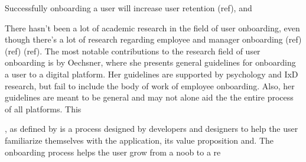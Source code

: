 Successfully onboarding a user will increase user retention (ref), and

There hasn't been a lot of academic research in the field of user onboarding, even though there's a lot of research regarding employee and manager onboarding (ref) (ref) (ref). The most notable contributions to the research field of user onboarding is by Oechsner, where she presents general guidelines for onboarding a user to a digital platform. Her guidelines are supported by psychology and IxD research, but fail to include the body of work of employee onboarding. Also, her guidelines are meant to be general and may not alone aid the the entire process of all platforms. This


, as defined by  is a process designed by developers and designers to help the user familiarize themselves with the application, its value proposition and. The onboarding process helps the user grow from a noob to a re







